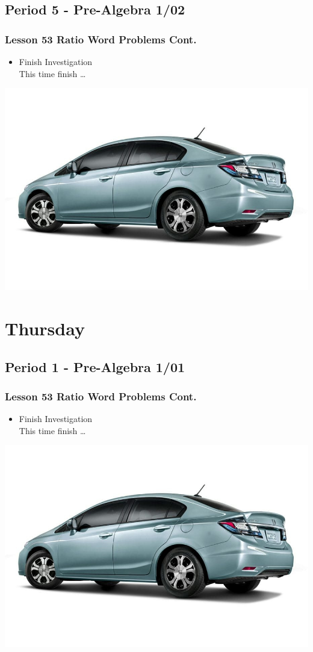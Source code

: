  \subsection[PA1/02]{Period 5 - Pre-Algebra 1/02}
      \begin{frame}[label=PA1_02]
        	\frametitle{Lesson 53 Ratio Word Problems Cont.}

       	\begin{itemize}
       		\item Finish  Investigation
       		\\ This time  finish \dots
       	\end{itemize}
       	\vspace{-20pt}
       	\begin{center}
       		\includegraphics[width=0.5\linewidth]{Images/honda_civic}
       	\end{center}
       	\vspace{-20pt}
       \end{frame}

   	 \section[Thu]{Thursday}
 \subsection[PA1/01]{Period 1 - Pre-Algebra 1/01}
 \begin{frame}[label=PA1_01]
  	       	\frametitle{Lesson 53 Ratio Word Problems Cont.}

  	       	\begin{itemize}
  	       		\item Finish  Investigation
  	       		\\ This time  finish \dots
  	       	\end{itemize}
  	       	\vspace{-20pt}
  	       	\begin{center}
  	       		\includegraphics[width=0.5\linewidth]{Images/honda_civic}
  	       	\end{center}
  	       	\vspace{-20pt}
  	       \end{frame}

